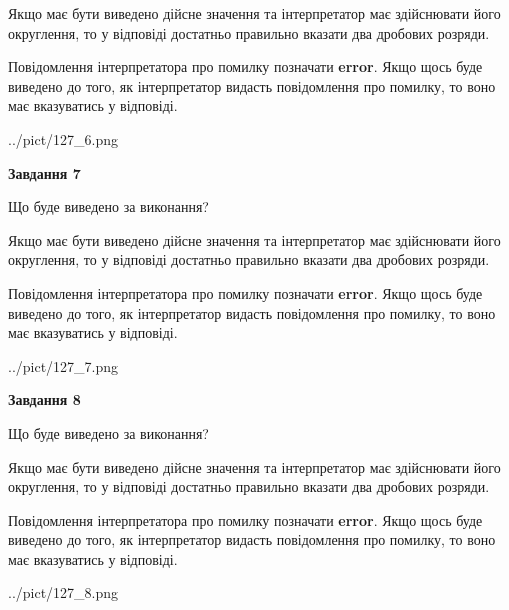 \documentclass[12pt, ukrainian]{article}
\begin{document}
{\begin {Large}
Якщо має бути виведено дійсне значення та інтерпретатор має здійснювати його округлення, 
то у відповіді достатньо правильно вказати два дробових розряди.

Повідомлення інтерпретатора про помилку позначати \textbf{error}.
Якщо щось буде виведено до того, як інтерпретатор видасть повідомлення про помилку, 
то воно має вказуватись у відповіді. \par

\begin{center}
	{../pict/127_6.png}
\end{center}
\newpage

{\begin {center}\textbf{Завдання 7}\end {center}}\par
Що буде виведено за виконання? \par

Якщо має бути виведено дійсне значення та інтерпретатор має здійснювати його округлення, 
то у відповіді достатньо правильно вказати два дробових розряди.

Повідомлення інтерпретатора про помилку позначати \textbf{error}.
Якщо щось буде виведено до того, як інтерпретатор видасть повідомлення про помилку, 
то воно має вказуватись у відповіді. \par

\begin{center}
	{../pict/127_7.png}
\end{center}
\newpage

{\begin {center}\textbf{Завдання 8}\end {center}}\par
Що буде виведено за виконання? \par

Якщо має бути виведено дійсне значення та інтерпретатор має здійснювати його округлення, 
то у відповіді достатньо правильно вказати два дробових розряди.

Повідомлення інтерпретатора про помилку позначати \textbf{error}.
Якщо щось буде виведено до того, як інтерпретатор видасть повідомлення про помилку, 
то воно має вказуватись у відповіді. \par

\begin{center}
	{../pict/127_8.png}
\end{center}
\newpage


\end{Large}}
\end{document}
